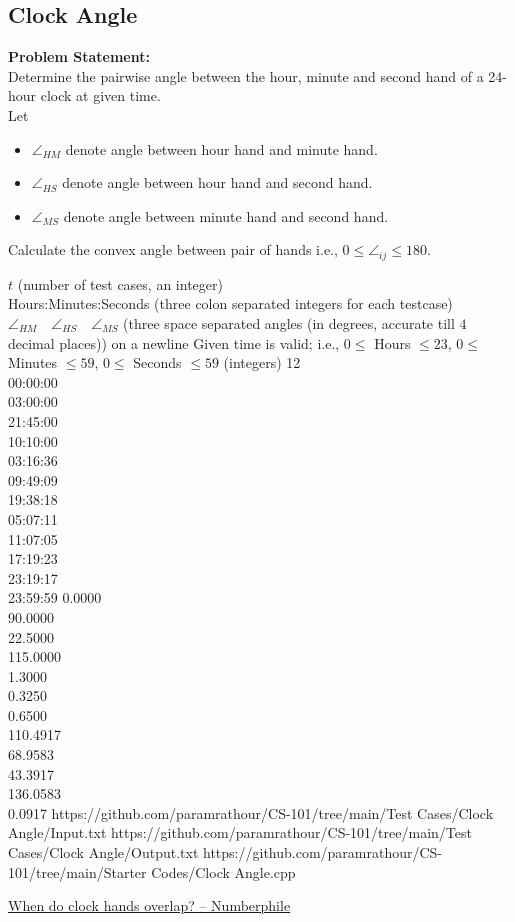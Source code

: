 \documentclass[../../Problems]{subfiles}
\begin{document}
\subsection{Clock Angle}
\textbf{Problem Statement:}\\
Determine the pairwise angle between the hour, minute and second hand of a 24-hour clock at given time.
\\Let
\begin{itemize}
\item $\angle_{HM}$ denote angle between hour hand and minute hand.
\item $\angle_{HS}$ denote angle between hour hand and second hand.
\item $\angle_{MS}$ denote angle between minute hand and second hand.
\end{itemize}
\begin{note}
Calculate the convex angle between pair of hands i.e., $0\leq\angle_{ij}\leq180$.
\end{note}
\begin{testcasesMore}
	{$t$ \hfill(number of test cases, an integer)\\
	Hours:Minutes:Seconds \hfill(three colon separated integers for each testcase)}
	{$\angle_{HM}\quad\angle_{HS}\quad\angle_{MS}$ \hfill{(three space separated angles (in degrees, accurate till $4$ decimal places)) on a newline}}
	{Given time is valid; i.e., $0 \leq$ Hours $\leq 23$, $0 \leq$ Minutes $\leq 59$, $0 \leq$ Seconds $\leq 59$ \hfill(integers)}
	{12\\00:00:00\\03:00:00\\21:45:00\\10:10:00\\03:16:36\\09:49:09\\19:38:18\\05:07:11\\11:07:05\\17:19:23\\23:19:17\\23:59:59}
	{0.0000\\90.0000\\22.5000\\115.0000\\1.3000\\0.3250\\0.6500\\110.4917\\68.9583\\43.3917\\136.0583\\0.0917}
	{https://github.com/paramrathour/CS-101/tree/main/Test Cases/Clock Angle/Input.txt}
	{https://github.com/paramrathour/CS-101/tree/main/Test Cases/Clock Angle/Output.txt}
	{https://github.com/paramrathour/CS-101/tree/main/Starter Codes/Clock Angle.cpp}
\end{testcasesMore}
\begin{funvideo}
\href{https://youtu.be/HcqdqsQq-6M}{When do clock hands overlap? -- Numberphile}
\end{funvideo}
\end{document}
